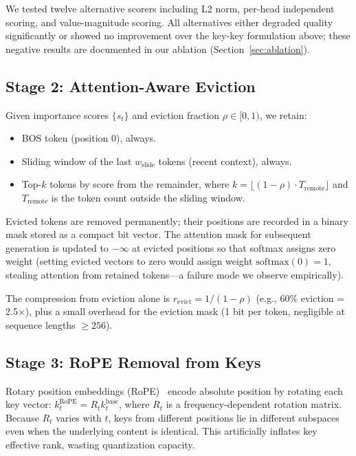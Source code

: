 \documentclass{article}
\begin{document}
We tested twelve alternative scorers including L2 norm, per-head independent
scoring, and value-magnitude scoring. All alternatives either degraded quality
significantly or showed no improvement over the key-key formulation above; these
negative results are documented in our ablation (Section~\ref{sec:ablation}).

\subsection{Stage 2: Attention-Aware Eviction}
\label{sec:eviction}

Given importance scores $\{s_t\}$ and eviction fraction $\rho \in [0, 1)$, we
retain:
\begin{itemize}
  \item BOS token (position 0), always.
  \item Sliding window of the last $w_\text{slide}$ tokens (recent context), always.
  \item Top-$k$ tokens by score from the remainder, where $k = \lfloor (1-\rho) \cdot
        T_\text{remote} \rfloor$ and $T_\text{remote}$ is the token count outside
        the sliding window.
\end{itemize}
Evicted tokens are removed permanently; their positions are recorded in a binary
mask stored as a compact bit vector. The attention mask for subsequent generation
is updated to $-\infty$ at evicted positions so that softmax assigns zero weight
(setting evicted vectors to zero would assign weight $\text{softmax}(0){=}1$,
stealing attention from retained tokens---a failure mode we observe empirically).

The compression from eviction alone is $r_\text{evict} = 1/(1-\rho)$ (e.g.,
60\% eviction = 2.5$\times$), plus a small overhead for the eviction mask
(1 bit per token, negligible at sequence lengths $\ge 256$).

\subsection{Stage 3: RoPE Removal from Keys}
\label{sec:rope}

Rotary position embeddings (RoPE)~\cite{rope2023} encode absolute position by
rotating each key vector: $k_t^{\text{RoPE}} = R_t k_t^{\text{base}}$, where
$R_t$ is a frequency-dependent rotation matrix. Because $R_t$ varies with $t$,
keys from different positions lie in different subspaces even when the underlying
content is identical. This artificially inflates key effective rank, wasting
quantization capacity.
\end{document}

